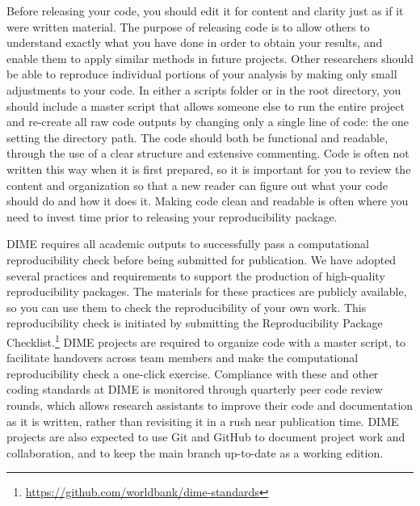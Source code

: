 \documentclass[
]{book}
\begin{document}
Before releasing your code, you should edit it for content and clarity
just as if it were written material.
The purpose of releasing code is to allow others to understand
exactly what you have done in order to obtain your results,
and enable them to apply similar methods in future projects.
Other researchers should be able to reproduce individual portions of your analysis
by making only small adjustments to your code.
In either a scripts folder or in the root directory,
you should include a master script that allows someone else to run the entire project
and re-create all raw code outputs by changing only a single line of code:
the one setting the directory path.
The code should both be functional and readable,
through the use of a clear structure and extensive commenting.
Code is often not written this way when it is first prepared,
so it is important for you to review the content and organization
so that a new reader can figure out what your code should do and how it does it.
Making code clean and readable is often where you need to invest time prior to releasing your reproducibility package.

DIME requires all academic outputs to successfully pass a computational reproducibility check
before being submitted for publication.
We have adopted several practices and requirements to support the production
of high-quality reproducibility packages.
The materials for these practices are publicly available,
so you can use them to check the reproducibility of your own work.
This reproducibility check is initiated by submitting the Reproducibility Package Checklist.\footnote{\url{https://github.com/worldbank/dime-standards}}
DIME projects are required to organize code
with a master script, to facilitate handovers across team members
and make the computational reproducibility check a one-click exercise.
Compliance with these and other coding standards at DIME is monitored through
quarterly peer code review rounds, which allows research assistants to improve their code and documentation as it is written,
rather than revisiting it in a rush near publication time.
DIME projects are also expected to use Git and GitHub
to document project work and collaboration,
and to keep the main branch up-to-date as a working edition.
\end{document}
